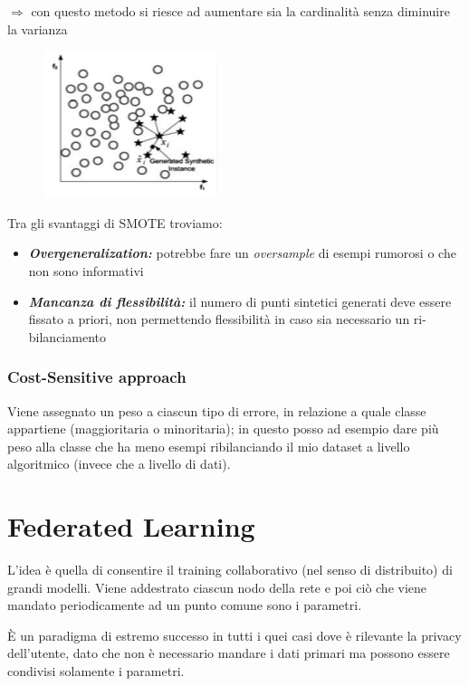 \documentclass{report}
\begin{document}
$\Rightarrow$ con questo metodo si riesce ad aumentare sia la cardinalità senza diminuire la varianza

\begin{figure}[H]
    \centering
    \includegraphics[width=0.5\linewidth]{images/smote.png}
\end{figure}

\noindent Tra gli svantaggi di SMOTE troviamo:
\begin{itemize}
    \item \textbf{\textit{Overgeneralization:}} potrebbe fare un \textit{oversample} di esempi rumorosi o che non sono informativi
    \item \textbf{\textit{Mancanza di flessibilità:}} il numero di punti sintetici generati deve essere fissato a priori, non permettendo 
    flessibilità in caso sia necessario un ri-bilanciamento
\end{itemize} 

\subsection{Cost-Sensitive approach}
Viene assegnato un peso a ciascun tipo di errore, in relazione a quale classe appartiene (maggioritaria o minoritaria); in questo posso ad esempio 
dare più peso alla classe che ha meno esempi ribilanciando il mio dataset a livello algoritmico (invece che a livello di dati).



\chapter{Federated Learning}

L'idea è quella di consentire il training collaborativo (nel senso di distribuito) di grandi modelli. Viene addestrato ciascun nodo della rete 
e poi ciò che viene mandato periodicamente ad un punto comune sono i parametri.

\noindent È un paradigma di estremo successo in tutti i quei casi dove è rilevante la privacy dell'utente, dato che non è necessario mandare 
i dati primari ma possono essere condivisi solamente i parametri.
\end{document}
